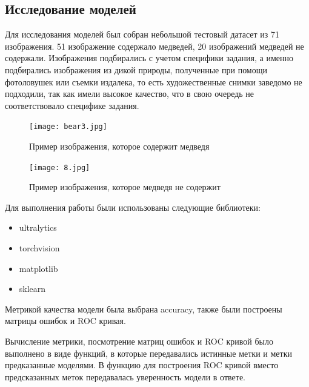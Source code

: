 \documentclass[../document.tex]{subfiles}
\begin{document}
 	\subsection{Исследование моделей}
 		\par Для исследования моделей был собран небольшой тестовый датасет из 71 изображения. 51 изображение содержало медведей, 20 изображений медведей не содержали. Изображения подбирались с учетом специфики задания, а именно подбирались изображения из дикой природы, полученные при помощи фотоловушек или съемки издалека, то есть художественные снимки заведомо не подходили, так как имели высокое качество, что в свою очередь не соответствовало специфике задания.
 		\begin{figure}[H]
 			\centering
 			\texttt{[image: bear3.jpg]}
 			\caption{Пример изображения, которое содержит медведя}
 		\end{figure}
 		\begin{figure}[H]
 			\centering
 			\texttt{[image: 8.jpg]}
 			\caption{Пример изображения, которое медведя не содержит}
 		\end{figure}
 		\par Для выполнения работы были использованы следующие библиотеки:
 		\begin{itemize}
 			\item ultralytics
 			\item torchvision
 			\item matplotlib
 			\item sklearn
 		\end{itemize}
 		\par Метрикой качества модели была выбрана accuracy, также были построены матрицы ошибок и ROC кривая.
 		\par Вычисление метрики, посмотрение матриц ошибок и ROC кривой было выполнено в виде функций, в которые передавались истинные метки и метки предказанные моделями. В функцию для построения ROC кривой вместо предсказанных меток передавалась уверенность модели в ответе.
 		
\end{document}
